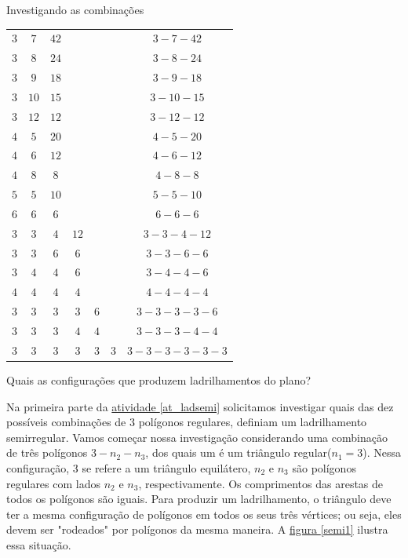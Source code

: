 \begin{task} {Investigando as combinações}
\setlength\tabcolsep{5mm}
\begin{longtabu} to \textwidth{|c|c|c|c|c|c|c|}
\hline\endfirsthead
{} &  &  & &  &  &  \\
\hline
$3$ & $7$ & $42$ & & & & $3-7-42$ \\
\hline
$3$ & $8$ & $24$ & & & & $3-8-24$ \\
\hline
$3$ & $9$ & $18$ & & & & $3-9-18$ \\
\hline
$3$ & $10$ & $15$ & & & & $ 3-10-15$ \\
\hline
$3$ & $12$ & $12$ & & & & $3-12-12$ \\
\hline
$4$ & $5$ & $20$ & & & & $4-5-20$ \\
\hline
$4$ & $6$ & $12$ & & & & $4-6-12$ \\
\hline
$4$ & $8$ & $8$ & & & & $4-8-8$ \\
\hline
$5$ & $5$ & $10$ & & & & $5-5-10$ \\
\hline
$6$ & $6$ & $6$ & & & & $6-6-6$ \\
\hline
$3$ & $3$ & $4$ & $12$ & & & $3-3-4-12$ \\
\hline
$3$ & $3$ & $6$ & $6$ & & & $3-3-6-6$ \\
\hline
$3$ & $4$ & $4$ & $6$ & & & $3-4-4-6$ \\
\hline
$4$ & $4$ & $4$ & $4$ & & & $4-4-4-4$ \\
\hline
$3$ & $3$ & $3$ & $3$ & $6$ & & $3-3-3-3-6$ \\
\hline
$3$ & $3$ & $3$ & $4$ & $4$ & & $3-3-3-4-4$ \\
\hline
$3$ & $3$ & $3$ & $3$ & $3$ & $3$ & $3-3-3-3-3-3$ \\
\hline
\end{longtabu}

Quais as configurações que produzem ladrilhamentos do plano?


\end{task}


Na primeira parte da \hyperref[at_ladsemi]{atividade \ref{at_ladsemi}} solicitamos investigar quais das dez possíveis combinações de 3 polígonos regulares, definiam um ladrilhamento semirregular. 
Vamos começar nossa investigação considerando uma combinação de três polígonos $3-n_2-n_3$, dos quais um é um triângulo regular($n_1=3$). 
Nessa configuração, $3$ se refere a um triângulo equilátero, $n_2$ e $n_3$ são polígonos regulares com lados $n_2$ e $n_3$, respectivamente. Os comprimentos das arestas de todos os polígonos são iguais. Para produzir um ladrilhamento, o triângulo deve ter a mesma configuração  de polígonos em todos os seus três vértices; ou seja, eles devem ser "rodeados" por polígonos da mesma maneira. A \hyperref[semi1]{figura \ref{semi1}} ilustra essa situação.  
 

